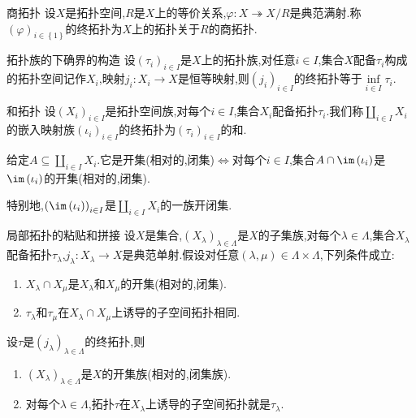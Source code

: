 \begin{definition}{商拓扑}{}
	设$X$是拓扑空间,$R$是$X$上的等价关系,$\varphi:X\twoheadrightarrow X/R$是典范满射.称$\left(\varphi\right)_{i\in\left\{1\right\}}$的终拓扑为$X$上的拓扑关于$R$的商拓扑.
\end{definition}

\begin{proposition}{拓扑族的下确界的构造}{}
	设$\left(\tau_{i}\right)_{i\in I}$是$X$上的拓扑族,对任意$i\in I$,集合$X$配备$\tau_{i}$构成的拓扑空间记作$X_{i}$,映射$j_{i}:X_{i}\to X$是恒等映射,则$\left(j_{i}\right)_{i\in I}$的终拓扑等于$\inf\limits_{i\in I}\tau_{i}$.
\end{proposition}

\begin{definition}{和拓扑}{}
	设$\left(X_{i}\right)_{i\in I}$是拓扑空间族,对每个$i\in I$,集合$X_{i}$配备拓扑$\tau_{i}$.我们称$\coprod\limits_{i\in I}X_{i}$的嵌入映射族$\left(\iota_{i}\right)_{i\in I}$的终拓扑为$\left(\tau_{i}\right)_{i\in I}$的和.
\end{definition}

\begin{remark}{}{}
	给定$A\subseteq\coprod\limits_{i\in I}X_{i}$.它是开集(相对的,闭集)$\iff$对每个$i\in I$,集合$A\cap\im\left(\iota_{i}\right)$是$\im\left(\iota_{i}\right)$的开集(相对的,闭集).
	
	特别地,$\left(\im\left(\iota_{i}\right)\right)_{i\in I}$是$\coprod\limits_{i\in I}X_{i}$的一族开闭集.
\end{remark}

\begin{proposition}{局部拓扑的粘贴和拼接}{}
	设$X$是集合,$\left(X_{\lambda}\right)_{\lambda\in\Lambda}$是$X$的子集族,对每个$\lambda\in\Lambda$,集合$X_{\lambda}$配备拓扑$\tau_{\lambda}$,$j_{\lambda}:X_{\lambda}\to X$是典范单射.假设对任意$\left(\lambda,\mu\right)\in\Lambda\times\Lambda$,下列条件成立:
	\begin{enumerate}
		\item $X_{\lambda}\cap X_{\mu}$是$X_{\lambda}$和$X_{\mu}$的开集(相对的,闭集).
		\item $\tau_{\lambda}$和$\tau_{\mu}$在$X_{\lambda}\cap X_{\mu}$上诱导的子空间拓扑相同.
	\end{enumerate}
	设$\tau$是$\left(j_{\lambda}\right)_{\lambda\in\Lambda}$的终拓扑,则
	\begin{enumerate}
		\item $\left(X_{\lambda}\right)_{\lambda\in\Lambda}$是$X$的开集族(相对的,闭集族).
		\item 对每个$\lambda\in\Lambda$,拓扑$\tau$在$X_{\lambda}$上诱导的子空间拓扑就是$\tau_{\lambda}$.
	\end{enumerate}
\end{proposition}


